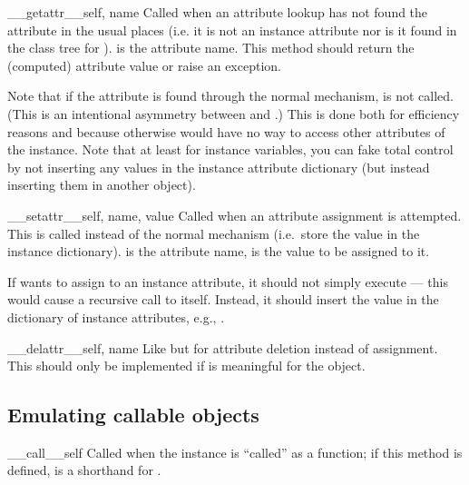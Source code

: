 \begin{methoddesc}[object]{__getattr__}{self, name}
Called when an attribute lookup has not found the attribute in the
usual places (i.e. it is not an instance attribute nor is it found in
the class tree for ).   is the attribute name.
This method should return the (computed) attribute value or raise an
 exception.

Note that if the attribute is found through the normal mechanism,
 is not called.  (This is an intentional
asymmetry between  and .)
This is done both for efficiency reasons and because otherwise
 would have no way to access other attributes of
the instance.
Note that at least for instance variables, you can fake
total control by not inserting any values in the instance
attribute dictionary (but instead inserting them in another object).
\end{methoddesc}

\begin{methoddesc}[object]{__setattr__}{self, name, value}
Called when an attribute assignment is attempted.  This is called
instead of the normal mechanism (i.e.\ store the value in the instance
dictionary).   is the attribute name,  is the
value to be assigned to it.

If  wants to assign to an instance attribute, it 
should not simply execute  --- this
would cause a recursive call to itself.  Instead, it should insert the
value in the dictionary of instance attributes, e.g.,
.
\end{methoddesc}

\begin{methoddesc}[object]{__delattr__}{self, name}
Like  but for attribute deletion instead of
assignment.  This should only be implemented if  is meaningful for the object.
\end{methoddesc}


\subsection{Emulating callable objects\label{callable-types}}

\begin{methoddesc}[object]{__call__}{self}
Called when the instance is ``called'' as a function; if this method
is defined,  is a shorthand for
.
\end{methoddesc}


